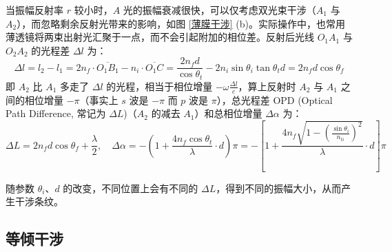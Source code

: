 \documentclass[UTF8]{report}
\theoremstyle{MyLineTheoremStyle} %
\theoremstyle{MyBlockTheoremStyle} %
\theoremstyle{MySubsubsectionStyle} %
\begin{document}
当振幅反射率 $r$ 较小时，$A$ 光的振幅衰减很快，可以仅考虑双光束干涉（$A_1$ 与 $A_2$），而忽略剩余反射光带来的影响，如图 \ref{薄膜干涉} (b)。实际操作中，也常用薄透镜将两束出射光汇聚于一点，而不会引起附加的相位差。反射后光线 $O_1A_1$ 与 $O_2A_2$ 的光程差 $\Delta l$ 为：
\begin{equation}
    \Delta l = l_2 - l_1 = 2 n_f\cdot  \overline{O_1B_1} - n_i\cdot  \overline{O_1 C} = \frac{2 n_f d}{\cos \theta_t} - 2 n_i \sin \theta_i \tan \theta_t d = 2 n_f d \cos \theta_f
\end{equation}
即 $A_2$ 比 $A_1$ 多走了 $\Delta l$ 的光程，相当于相位增量 $ - \omega \frac{\Delta l}{c}$，算上反射时 $A_2$ 与 $A_1$ 之间的相位增量 $-\pi$（事实上 $s$ 波是 $-\pi$ 而 $p$ 波是 $\pi$），总光程差 OPD (Optical Path Difference, 常记为 $\Delta L$)（$A_2$ 的减去 $A_1$）和总相位增量 $\Delta \alpha$ 为：
\begin{equation}
    \boxed{
        \Delta L = 2 n_f d \cos \theta_f + \frac{\lambda}{2}
    } ,\quad \Delta \alpha 
    = - \left(1 + \frac{4 n_f  \cos \theta_t}{\lambda} \cdot d \right) \pi
    = - \left[ 1 + \frac{4 n_f \sqrt{ 1 - \left(\frac{\sin \theta_i}{n_{ti}} \right)^2 }  }{\lambda} \cdot d \right] \pi
\end{equation}

随参数 $\theta_i$、$d$ 的改变，不同位置上会有不同的 $\Delta L$，得到不同的振幅大小，从而产生干涉条纹。

\subsection{等倾干涉}
\end{document}
